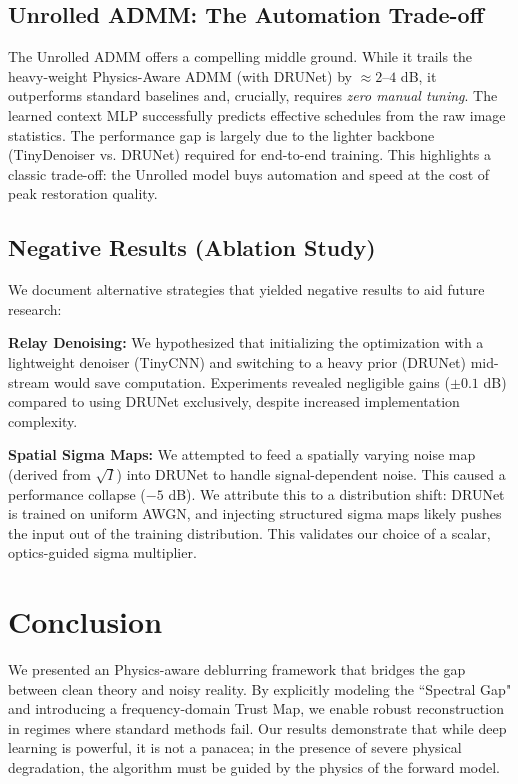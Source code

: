 \documentclass[10pt,journal,compsoc]{IEEEtran}
\begin{document}
\subsection{Unrolled ADMM: The Automation Trade-off}
The Unrolled ADMM offers a compelling middle ground. While it trails the heavy-weight Physics-Aware ADMM (with DRUNet) by $\approx 2\text{--}4$ dB, it outperforms standard baselines and, crucially, requires \textit{zero manual tuning}. The learned context MLP successfully predicts effective schedules from the raw image statistics. The performance gap is largely due to the lighter backbone (TinyDenoiser vs. DRUNet) required for end-to-end training. This highlights a classic trade-off: the Unrolled model buys automation and speed at the cost of peak restoration quality.

\subsection{Negative Results (Ablation Study)}
We document alternative strategies that yielded negative results to aid future research:

\textbf{Relay Denoising:} We hypothesized that initializing the optimization with a lightweight denoiser (TinyCNN) and switching to a heavy prior (DRUNet) mid-stream would save computation. Experiments revealed negligible gains ($\pm 0.1$ dB) compared to using DRUNet exclusively, despite increased implementation complexity.

\textbf{Spatial Sigma Maps:} We attempted to feed a spatially varying noise map (derived from $\sqrt{I}$) into DRUNet to handle signal-dependent noise. This caused a performance collapse ($-5$ dB). We attribute this to a distribution shift: DRUNet is trained on uniform AWGN, and injecting structured sigma maps likely pushes the input out of the training distribution. This validates our choice of a scalar, optics-guided sigma multiplier.

\section{Conclusion}
We presented an Physics-aware deblurring framework that bridges the gap between clean theory and noisy reality. By explicitly modeling the ``Spectral Gap" and introducing a frequency-domain Trust Map, we enable robust reconstruction in regimes where standard methods fail. Our results demonstrate that while deep learning is powerful, it is not a panacea; in the presence of severe physical degradation, the algorithm must be guided by the physics of the forward model.
\end{document}
